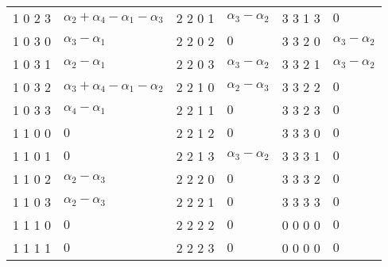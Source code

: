\begin{longtable}{|l|l|l|l|l|l|}
1 0 2 3 & \(\alpha_2 + \alpha_4 - \alpha_1 - \alpha_3\) & 2 2 0 1 & \(\alpha_3 - \alpha_2\) & 3 3 1 3 & \(0\) \\ 
1 0 3 0 & \(\alpha_3 - \alpha_1\) & 2 2 0 2 & \(0\) & 3 3 2 0 & \(\alpha_3 - \alpha_2\) \\ 
1 0 3 1 & \(\alpha_2 - \alpha_1\) & 2 2 0 3 & \(\alpha_3 - \alpha_2\) & 3 3 2 1 & \(\alpha_3 - \alpha_2\) \\ 
1 0 3 2 & \(\alpha_3 + \alpha_4 - \alpha_1 - \alpha_2\) & 2 2 1 0 & \(\alpha_2 - \alpha_3\) & 3 3 2 2 & \(0\) \\ 
1 0 3 3 & \(\alpha_4 - \alpha_1\) & 2 2 1 1 & \(0\) & 3 3 2 3 & \(0\) \\ 
1 1 0 0 & \(0\) & 2 2 1 2 & \(0\) & 3 3 3 0 & \(0\) \\ 
1 1 0 1 & \(0\) & 2 2 1 3 & \(\alpha_3 - \alpha_2\) & 3 3 3 1 & \(0\) \\ 
1 1 0 2 & \(\alpha_2 - \alpha_3\) & 2 2 2 0 & \(0\) & 3 3 3 2 & \(0\) \\ 
1 1 0 3 & \(\alpha_2 - \alpha_3\) & 2 2 2 1 & \(0\) & 3 3 3 3 & \(0\) \\ 
1 1 1 0 & \(0\) & 2 2 2 2 & \(0\) & 0 0 0 0 & \(0\) \\ 
1 1 1 1 & \(0\) & 2 2 2 3 & \(0\) & 0 0 0 0 & \(0\) \\ 
\end{longtable}